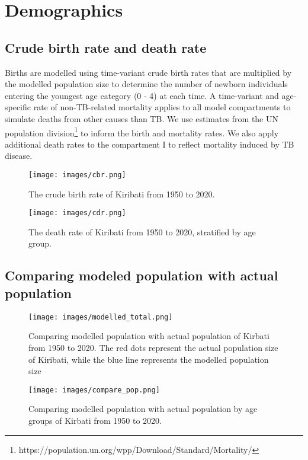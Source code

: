 

\section{Demographics}
\subsection{Crude birth rate and death rate}
Births are modelled using time-variant crude birth rates that are multiplied by the modelled population 
size to determine the number of newborn individuals entering the youngest age category (0 - 4) at each time. A time-variant 
and age-specific rate of non-TB-related mortality applies to all model compartments to simulate 
deaths from other causes than TB. We use estimates from the UN population division\footnote{https://population.un.org/wpp/Download/Standard/Mortality/} to inform the 
birth and mortality rates.
We also apply additional death rates to the compartment I to reflect mortality induced by TB 
disease.
\begin{figure}[!htb]
    \texttt{[image: images/cbr.png]}
    \caption{The crude birth rate of Kiribati from 1950 to 2020.}
    \label{fig:cbr}
\end{figure}

\begin{figure}[!htb]
    \texttt{[image: images/cdr.png]}
    \caption{The death rate of Kiribati from 1950 to 2020, stratified by age group.}
    \label{fig:cdr}
\end{figure}

\subsection{Comparing modeled population with actual population}
\begin{figure}[!htb]
    \texttt{[image: images/modelled\_total.png]}
    \caption{Comparing modelled population with actual population of Kirbati from 1950 to 2020. The red dots represent the actual population size of Kiribati,
     while the blue line represents the modelled population size}
    \label{fig:modelled_total}
\end{figure}

\begin{figure}[!htb]
    \texttt{[image: images/compare\_pop.png]}
    \caption{Comparing modelled population with actual population by age groups of Kirbati from 1950 to 2020.}
    \label{fig:compare_group}
\end{figure}